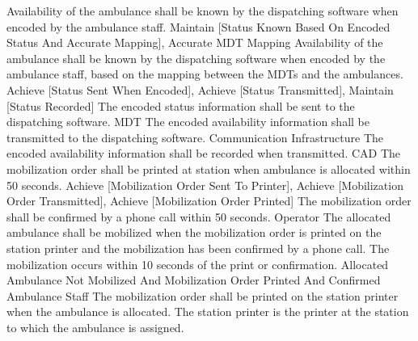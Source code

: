 	 {Availability of the ambulance shall be known by the dispatching software when encoded by the ambulance staff.}
	 {Maintain [Status Known Based On Encoded Status And Accurate Mapping], Accurate MDT Mapping}
\stopkaosspec
\startkaosspec
	 {Availability of the ambulance shall be known by the dispatching software when encoded by the ambulance staff, based on the mapping between the MDTs and the ambulances.}
	 {Achieve [Status Sent When Encoded], Achieve [Status Transmitted], Maintain [Status Recorded]}
\stopkaosspec
\startkaosspec
	 {The encoded status information shall be sent to the dispatching software.}
	 {MDT}
\stopkaosspec
\startkaosspec
	 {The encoded availability information shall be transmitted to the dispatching software.}
	 {Communication Infrastructure}
\stopkaosspec
\startkaosspec
	 {The encoded availability information shall be recorded when transmitted.}
	 {CAD}
\stopkaosspec
\startkaosspec
	 {The mobilization order shall be printed at station when ambulance is allocated within 50 seconds.}
	 {Achieve [Mobilization Order Sent To Printer], Achieve [Mobilization Order Transmitted], Achieve [Mobilization Order Printed]}
\stopkaosspec
\startkaosspec
	 {The mobilization order shall be confirmed by a phone call within 50 seconds.}
	 {Operator}
\stopkaosspec
\startkaosspec
	 {The allocated ambulance shall be mobilized when the mobilization order is printed on the station printer and the mobilization has been confirmed by a phone call. The mobilization occurs within 10 seconds of the print or confirmation.}
	 {Allocated Ambulance Not Mobilized And Mobilization Order Printed And Confirmed}
	 {Ambulance Staff}
\stopkaosspec
\startkaosspec
	 {The mobilization order shall be printed on the station printer when the ambulance is allocated. The station printer is the printer at the station to which the ambulance is assigned.}
